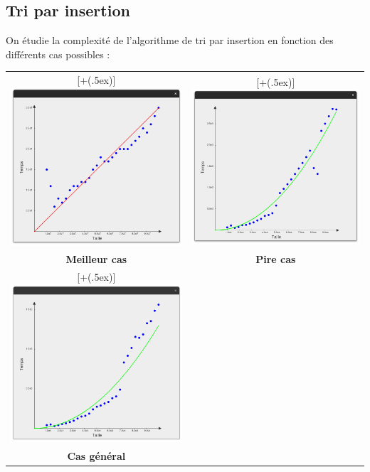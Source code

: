 \documentclass[12pt]{article}
\newcommand*{\addheight}[2][.5ex]{%
  \raisebox{0pt}[\dimexpr\height+(#1)\relax]{#2}%
}
\begin{document}
\subsection{Tri par insertion}

On étudie la complexité de l'algorithme de tri par insertion en fonction des différents cas possibles :
\newline

\begin{tabular}[H]{c c}
    \addheight{\includegraphics[width=18em]{ins_meilleur.png}} &
    \addheight{\includegraphics[width=18em]{ins_pire.png}} \\
    \small \textbf{Meilleur cas} & \textbf{Pire cas} \\
    \addheight{\includegraphics[width=18em]{ins_gen.png}}  & \\
    \small \textbf{Cas général} & \\
\end{tabular}
\end{document}
